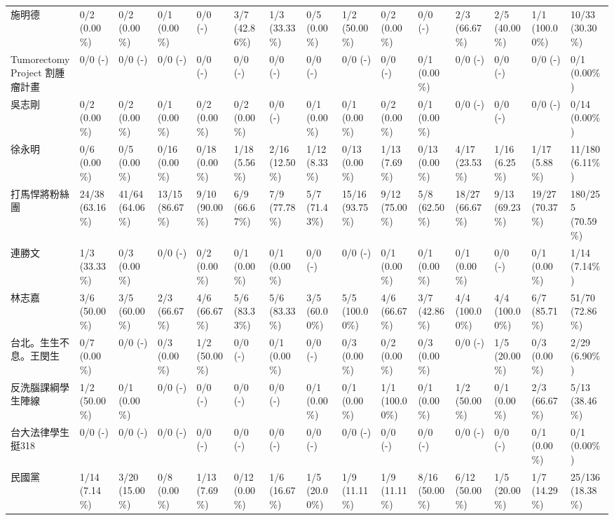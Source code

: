 \documentclass[a4paper, 10pt, conference]{ieeeconf}       %
\begin{document}
\begin{CJK}{UTF8}{bsmi}
\begin{landscape}
\begin{longtable}[c]{@{}L{2.45cm}L{1.1cm}L{1.1cm}L{1.1cm}L{1.1cm}L{1.1cm}L{1.1cm}L{1.1cm}L{1.1cm}L{1.1cm}L{1.1cm}L{1.1cm}L{1.1cm}L{1.1cm}L{1.1cm}@{}}
施明德 & 0/2 (0.00\%) & 0/2 (0.00\%) & 0/1 (0.00\%) & 0/0 (-) & 3/7 (42.86\%) & 1/3 (33.33\%) & 0/5 (0.00\%) & 1/2 (50.00\%) & 0/2 (0.00\%) & 0/0 (-) & 2/3 (66.67\%) & 2/5 (40.00\%) & 1/1 (100.00\%) & 10/33 (30.30\%) \\
Tumorectomy Project 割腫瘤計畫 & 0/0 (-) & 0/0 (-) & 0/0 (-) & 0/0 (-) & 0/0 (-) & 0/0 (-) & 0/0 (-) & 0/0 (-) & 0/0 (-) & 0/1 (0.00\%) & 0/0 (-) & 0/0 (-) & 0/0 (-) & 0/1 (0.00\%) \\
吳志剛 & 0/2 (0.00\%) & 0/2 (0.00\%) & 0/1 (0.00\%) & 0/2 (0.00\%) & 0/2 (0.00\%) & 0/0 (-) & 0/1 (0.00\%) & 0/1 (0.00\%) & 0/2 (0.00\%) & 0/1 (0.00\%) & 0/0 (-) & 0/0 (-) & 0/0 (-) & 0/14 (0.00\%) \\
徐永明 & 0/6 (0.00\%) & 0/5 (0.00\%) & 0/16 (0.00\%) & 0/18 (0.00\%) & 1/18 (5.56\%) & 2/16 (12.50\%) & 1/12 (8.33\%) & 0/13 (0.00\%) & 1/13 (7.69\%) & 0/13 (0.00\%) & 4/17 (23.53\%) & 1/16 (6.25\%) & 1/17 (5.88\%) & 11/180 (6.11\%) \\
打馬悍將粉絲團 & 24/38 (63.16\%) & 41/64 (64.06\%) & 13/15 (86.67\%) & 9/10 (90.00\%) & 6/9 (66.67\%) & 7/9 (77.78\%) & 5/7 (71.43\%) & 15/16 (93.75\%) & 9/12 (75.00\%) & 5/8 (62.50\%) & 18/27 (66.67\%) & 9/13 (69.23\%) & 19/27 (70.37\%) & 180/255 (70.59\%) \\
連勝文 & 1/3 (33.33\%) & 0/3 (0.00\%) & 0/0 (-) & 0/2 (0.00\%) & 0/1 (0.00\%) & 0/1 (0.00\%) & 0/0 (-) & 0/0 (-) & 0/1 (0.00\%) & 0/1 (0.00\%) & 0/1 (0.00\%) & 0/0 (-) & 0/1 (0.00\%) & 1/14 (7.14\%) \\
林志嘉 & 3/6 (50.00\%) & 3/5 (60.00\%) & 2/3 (66.67\%) & 4/6 (66.67\%) & 5/6 (83.33\%) & 5/6 (83.33\%) & 3/5 (60.00\%) & 5/5 (100.00\%) & 4/6 (66.67\%) & 3/7 (42.86\%) & 4/4 (100.00\%) & 4/4 (100.00\%) & 6/7 (85.71\%) & 51/70 (72.86\%) \\
台北。生生不息。王閔生 & 0/7 (0.00\%) & 0/0 (-) & 0/3 (0.00\%) & 1/2 (50.00\%) & 0/0 (-) & 0/1 (0.00\%) & 0/0 (-) & 0/3 (0.00\%) & 0/2 (0.00\%) & 0/3 (0.00\%) & 0/0 (-) & 1/5 (20.00\%) & 0/3 (0.00\%) & 2/29 (6.90\%) \\
反洗腦課綱學生陣線 & 1/2 (50.00\%) & 0/1 (0.00\%) & 0/0 (-) & 0/0 (-) & 0/0 (-) & 0/0 (-) & 0/1 (0.00\%) & 0/1 (0.00\%) & 1/1 (100.00\%) & 0/1 (0.00\%) & 1/2 (50.00\%) & 0/1 (0.00\%) & 2/3 (66.67\%) & 5/13 (38.46\%) \\
台大法律學生挺318 & 0/0 (-) & 0/0 (-) & 0/0 (-) & 0/0 (-) & 0/0 (-) & 0/0 (-) & 0/0 (-) & 0/0 (-) & 0/0 (-) & 0/0 (-) & 0/0 (-) & 0/0 (-) & 0/1 (0.00\%) & 0/1 (0.00\%) \\
民國黨 & 1/14 (7.14\%) & 3/20 (15.00\%) & 0/8 (0.00\%) & 1/13 (7.69\%) & 0/12 (0.00\%) & 1/6 (16.67\%) & 1/5 (20.00\%) & 1/9 (11.11\%) & 1/9 (11.11\%) & 8/16 (50.00\%) & 6/12 (50.00\%) & 1/5 (20.00\%) & 1/7 (14.29\%) & 25/136 (18.38\%) \\

\end{longtable}
\end{landscape}
\end{CJK}
\end{document}
